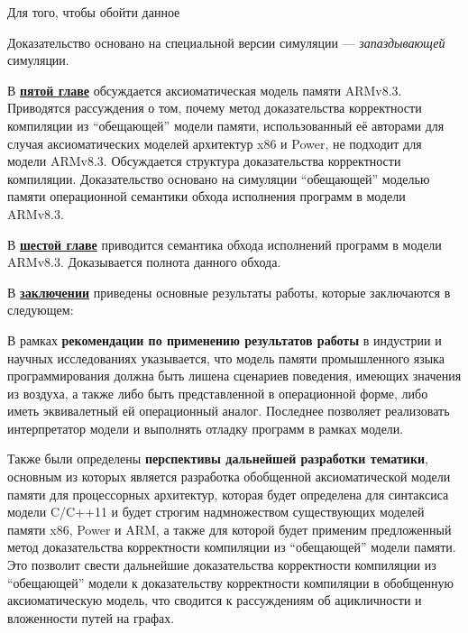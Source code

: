 Для того, чтобы обойти данное 


Доказательство основано на специальной версии симуляции --- \emph{запаздывающей} симуляции.

В \underline{\textbf{пятой главе}} обсуждается аксиоматическая модель памяти ARMv8.3.
Приводятся рассуждения о том, почему
метод доказательства корректности компиляции из ``обещающей'' модели памяти, использованный её авторами для случая
аксиоматических моделей архитектур x86 и Power, не подходит для модели ARMv8.3.
Обсуждается структура доказательства корректности компиляции. Доказательство основано на симуляции ``обещающей'' моделью
памяти операционной семантики обхода исполнения программ в модели ARMv8.3.

В \underline{\textbf{шестой главе}} приводится семантика обхода исполнений программ в модели ARMv8.3. Доказывается
полнота данного обхода.

В \underline{\textbf{заключении}} приведены основные результаты работы, которые заключаются в следующем:


В рамках \textbf{рекомендации по применению результатов работы} в индустрии и научных исследованиях указывается,
что модель памяти промышленного языка программирования должна быть лишена сценариев поведения, имеющих значения
из воздуха, а также либо быть представленной в операционной форме, либо иметь эквивалетный ей операционный аналог.
Последнее позволяет реализовать интерпретатор модели и выполнять отладку программ в рамках модели.

Также были определены \textbf{перспективы дальнейшей разработки тематики}, основным из которых является
разработка обобщенной аксиоматической модели памяти для процессорных архитектур, которая будет
определена для синтаксиса модели C/C++11 и будет строгим надмножеством существующих моделей памяти
x86, Power и ARM, а также для которой будет применим предложенный метод доказательства корректности компиляции
из ``обещающей'' модели памяти. Это позволит свести дальнейшие доказательства корректности компиляции из
``обещающей'' модели к доказательству корректности компиляции в обобщенную аксиоматическую модель, что
сводится к рассуждениям об ацикличности и вложенности путей на графах.


